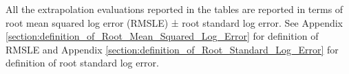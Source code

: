 \documentclass{article} %
\begin{document}
All the extrapolation evaluations reported in the tables are reported in terms of root mean squared log error (RMSLE) ± root standard log error. See Appendix \ref{section:definition_of_Root_Mean_Squared_Log_Error} for definition of RMSLE and Appendix \ref{section:definition_of_Root_Standard_Log_Error} for definition of root standard log error.

\vspace{-0.3mm}



\end{document}
